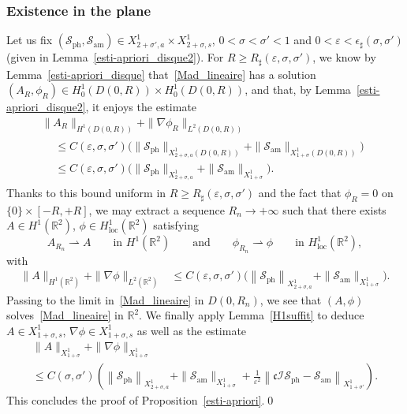 \documentclass[10pt]{amsart}
\theoremstyle{definition}\newtheorem{defi}[theo]{Definition}\newtheorem{rema}[theo]{Remark}\newtheorem{exam}[theo]{Example}\newtheorem{exem}[theo]{Example}\newtheorem{nota}[theo]{Notation}
\newcommand*\R{\mathbb R}
\newcommand{\amm}{\mathrm{am}}
\newcommand{\phl}{\mathrm{ph}}
\newcommand{\locc}{\mathrm{loc}}
\newcommand*\BI{\mathcal{I}}
\newcommand*\BS{\mathcal{S}}
\newcommand*\cs{{\mathfrak c}}
\newcommand*\ii{\infty}
\newcommand*\gs{\geqslant }
\newcommand*\ls{\leqslant }
\newcommand*\e{\varepsilon}
\newcommand*\ep{\epsilon}
\newcommand*\s{\sigma}
\begin{document}
\subsubsection{Existence in the plane}

Let us fix $ (\BS_{\phl}, \BS_{\amm}) \in X^1_{2+\s',a} \times X^1_{2+\s,s} $, $ 0 < \s < \s' < 1 $ and $ 0 < \e < \ep_\sharp (\s, \s') $ (given in Lemma~\ref{esti-apriori_disque2}). For $ R \gs R_\sharp (\e, \s, \s') $, we know by Lemma~\ref{esti-apriori_disque} that~\eqref{Mad_lineaire} has a solution $ (A_R, \phi_R) \in H^{1}_0(D(0,R)) \times H^{1}_0(D(0,R)) $, and that, by Lemma~\ref{esti-apriori_disque2}, it enjoys the estimate
\begin{multline*}
\| A_R \|_{ H^1(D(0,R)) }  + \| \nabla \phi_R \|_{ L^2 (D(0,R)) }\\
\begin{aligned}
& \ls C (\e, \s, \s')
\Big(
\| \BS_{\phl} \|_{ X^{1}_{ 2+\s, a} (D(0,R))} + \| \BS_{\amm} \|_{ X^{ 1}_{1+\s} (D(0,R))} \Big)
\\ & \ls C (\e, \s, \s')
\Big(
\| \BS_{\phl} \|_{ X^{1}_{ 2+\s, a} } + \| \BS_{\amm} \|_{ X^{ 1}_{1+\s} } \Big).
\end{aligned}
\end{multline*}
Thanks to this bound uniform in $ R \gs R_\sharp (\e, \s, \s') $ and the fact that $ \phi_R = 0 $ on $ \{ 0 \} \times [-R,+R] $, we may extract a sequence $ R_n \to +\ii $ such that there exists $ A \in H^1 (\R^2) $, $ \phi \in H^1_{\locc} (\R^2) $ satisfying
\[
A_{R_n} \rightharpoonup A \qquad \text{in } H^1 (\R^2)
\qquad \text {and} \qquad
\phi_{R_n} \rightharpoonup \phi \qquad \text{in } H^1_{\locc} (\R^2),
\]
with
\begin{align*}
\| A \|_{ H^1(\R^2) } + \| \nabla \phi \|_{ L^2 (\R^2) } & \ls C (\e, \s, \s')
\Big(
\left\| \BS_{\phl} \right\|_{ X^{1}_{ 2+\s, a} } + \| \BS_{\amm} \|_{ X^{ 1}_{1+\s} } \Big).
\end{align*}
Passing to the limit in~\eqref{Mad_lineaire} in $ D(0,R_n) $, we see that $ (A, \phi) $ solves~\eqref{Mad_lineaire} in $ \R^2 $. We finally apply Lemma~\ref{H1suffit} to deduce $ A \in X^1_{1+\s, s} $, $ \nabla \phi \in X^1_{1+\s, s} $ as well as the estimate
\begin{multline*}
\| A \|_{ X^1_{ 1+ \s} } + \| \nabla \phi \|_{ X^1_{1+ \s} }\\
\ls C (\s, \s')
\left(
\left\| \BS_{\phl} \right\|_{ X^{1}_{ 2+\s, a} } + \| \BS_{\amm} \|_{ X^{ 1}_{1+\s} } + \frac{1}{\e^2} \left\| \cs \BI \BS_{\phl} - \BS_{\amm} \right\|_{ X^{1}_{1+\s'} }
\right).
\end{multline*}
This concludes the proof of Proposition~\ref{esti-apriori}.\qed
\end{document}
